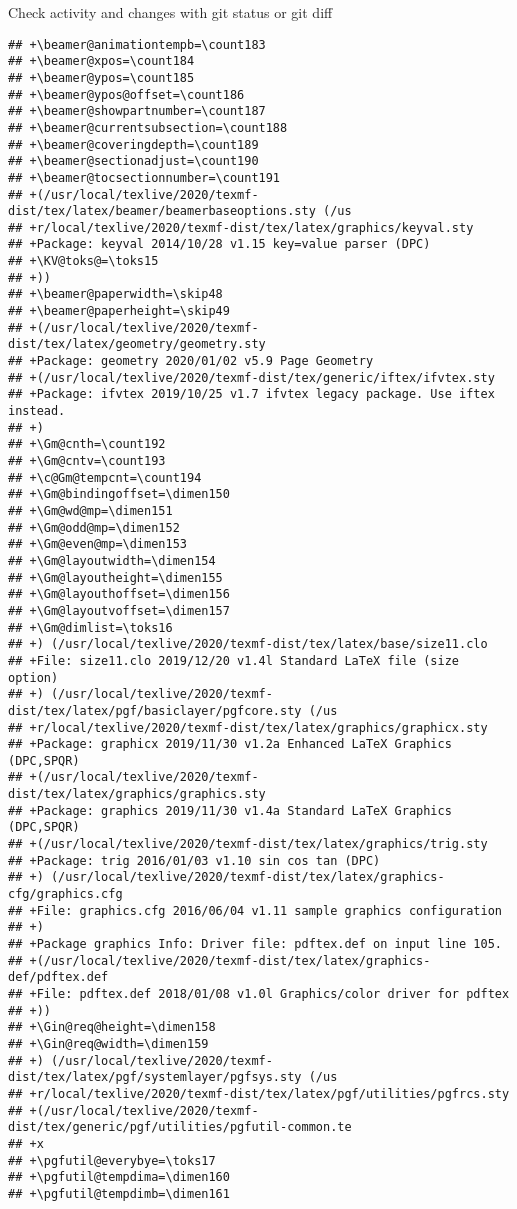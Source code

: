 \documentclass[ignorenonframetext,]{beamer}
\begin{document}
\begin{frame}[fragile]{Check activity and changes with git status or git
diff}
\begin{verbatim}
## +\beamer@animationtempb=\count183
## +\beamer@xpos=\count184
## +\beamer@ypos=\count185
## +\beamer@ypos@offset=\count186
## +\beamer@showpartnumber=\count187
## +\beamer@currentsubsection=\count188
## +\beamer@coveringdepth=\count189
## +\beamer@sectionadjust=\count190
## +\beamer@tocsectionnumber=\count191
## +(/usr/local/texlive/2020/texmf-dist/tex/latex/beamer/beamerbaseoptions.sty (/us
## +r/local/texlive/2020/texmf-dist/tex/latex/graphics/keyval.sty
## +Package: keyval 2014/10/28 v1.15 key=value parser (DPC)
## +\KV@toks@=\toks15
## +))
## +\beamer@paperwidth=\skip48
## +\beamer@paperheight=\skip49
## +(/usr/local/texlive/2020/texmf-dist/tex/latex/geometry/geometry.sty
## +Package: geometry 2020/01/02 v5.9 Page Geometry
## +(/usr/local/texlive/2020/texmf-dist/tex/generic/iftex/ifvtex.sty
## +Package: ifvtex 2019/10/25 v1.7 ifvtex legacy package. Use iftex instead.
## +)
## +\Gm@cnth=\count192
## +\Gm@cntv=\count193
## +\c@Gm@tempcnt=\count194
## +\Gm@bindingoffset=\dimen150
## +\Gm@wd@mp=\dimen151
## +\Gm@odd@mp=\dimen152
## +\Gm@even@mp=\dimen153
## +\Gm@layoutwidth=\dimen154
## +\Gm@layoutheight=\dimen155
## +\Gm@layouthoffset=\dimen156
## +\Gm@layoutvoffset=\dimen157
## +\Gm@dimlist=\toks16
## +) (/usr/local/texlive/2020/texmf-dist/tex/latex/base/size11.clo
## +File: size11.clo 2019/12/20 v1.4l Standard LaTeX file (size option)
## +) (/usr/local/texlive/2020/texmf-dist/tex/latex/pgf/basiclayer/pgfcore.sty (/us
## +r/local/texlive/2020/texmf-dist/tex/latex/graphics/graphicx.sty
## +Package: graphicx 2019/11/30 v1.2a Enhanced LaTeX Graphics (DPC,SPQR)
## +(/usr/local/texlive/2020/texmf-dist/tex/latex/graphics/graphics.sty
## +Package: graphics 2019/11/30 v1.4a Standard LaTeX Graphics (DPC,SPQR)
## +(/usr/local/texlive/2020/texmf-dist/tex/latex/graphics/trig.sty
## +Package: trig 2016/01/03 v1.10 sin cos tan (DPC)
## +) (/usr/local/texlive/2020/texmf-dist/tex/latex/graphics-cfg/graphics.cfg
## +File: graphics.cfg 2016/06/04 v1.11 sample graphics configuration
## +)
## +Package graphics Info: Driver file: pdftex.def on input line 105.
## +(/usr/local/texlive/2020/texmf-dist/tex/latex/graphics-def/pdftex.def
## +File: pdftex.def 2018/01/08 v1.0l Graphics/color driver for pdftex
## +))
## +\Gin@req@height=\dimen158
## +\Gin@req@width=\dimen159
## +) (/usr/local/texlive/2020/texmf-dist/tex/latex/pgf/systemlayer/pgfsys.sty (/us
## +r/local/texlive/2020/texmf-dist/tex/latex/pgf/utilities/pgfrcs.sty
## +(/usr/local/texlive/2020/texmf-dist/tex/generic/pgf/utilities/pgfutil-common.te
## +x
## +\pgfutil@everybye=\toks17
## +\pgfutil@tempdima=\dimen160
## +\pgfutil@tempdimb=\dimen161

\end{verbatim}
\end{frame}
\end{document}
